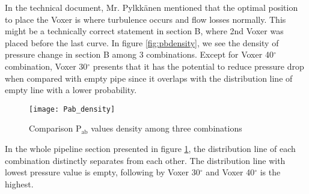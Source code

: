In the technical document, Mr. Pylkkänen mentioned that the optimal position to place the Voxer is where turbulence occurs and flow losses normally. This might be a technically correct statement in section B, where 2nd Voxer was placed before the last curve. In figure \ref{fig:pbdensity}, we see the density of pressure change in section B among 3 combinations. Except for Voxer 40$^{\circ}$ combination, Voxer 30$^{\circ}$ presents that it has the potential to reduce pressure drop when compared with empty pipe since it overlaps with the distribution line of empty line with a lower probability.  
\newpage

\begin{figure}[t]
  \centering
  \texttt{[image: Pab\_density]}
  \caption{ Comparison P$_{\text{ab}}$ values density among three combinations}
  \label{fig:pabdensity}
\end{figure}

In the whole pipeline section presented in figure \ref{fig:pabdensity}, the distribution line of each combination distinctly separates from each other. The distribution line with lowest pressure value is empty, following by Voxer 30$^{\circ}$ and Voxer 40$^{\circ}$  is the highest.
\clearpage %
